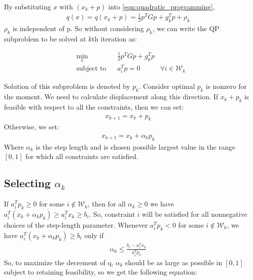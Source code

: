 By substituting $x$ with $(x_k+p)$ into \ref{eqn:quadratic_programming},
\begin{equation*}
	\begin{aligned}
		q(x) = q(x_k+p)= \frac{1}{2}p^TGp+g_k^Tp+\rho_k
	\end{aligned}
\end{equation*}
$\rho_k$ is independent of p. So without considering $\rho_k$, we can write the QP subproblem to be solved at $k$th iteration as:

\begin{equation}
	\begin{aligned}
		& \underset{x}{\text{min}} & & \frac{1}{2}p^{T}Gp+g_{k}^{T}p \\
& \text{subject to} & &  a_{i}^{T}p = 0 & \forall i\in \mathcal{W}_k
	\end{aligned}
	\label{eqn:Active_set_1}
\end{equation}

Solution of this subproblem is denoted by $p_k$. Consider optimal $p_k$ is nonzero for the moment. We need to calculate displacement along this direction. If $x_k+p_k$ is feasible with respect to all the constraints, then we can set:
\begin{equation*}
\begin{aligned}
	x_{k+1} = x_k + p_k
\end{aligned}
\end{equation*} 
Otherwise, we set:
\begin{equation}
	\begin{aligned}
		x_{k+1} = x_k + \alpha_{k}p_{k}
	\end{aligned}
	\label{eqn:Active_set_2}
\end{equation}
Where $\alpha_k$ is the step length and is chosen possible largest value in the range $[0,1]$ for which all constraints are satisfied.

\subsection*{Selecting $\alpha_k$}
If $a_{i}^{T}p_{k} \geqslant 0$ for some $i\notin \mathcal{W}_k$, then for all $\alpha_k \geqslant 0$ we have $a_{i}^T(x_k+\alpha_kp_k)\geqslant a_{i}^Tx_k \geqslant b_i$. So, constraint $i$ will be satisfied for all nonnegative choices of the step-length parameter. Whenever $a_i^Tp_k < 0$ for some $i\notin \mathcal{W}_k$, we have  $a_{i}^T(x_k+\alpha_kp_k) \geqslant b_i$ only if
\begin{equation*}
	\begin{aligned}
		\alpha_k \leqslant \frac{b_i-a_i^Tx_k}{a_i^Tp_k}
	\end{aligned}
\end{equation*}
So, to maximize the decrement of q, $\alpha_k$ should be as large as possible in $[0,1]$ subject to retaining feasibility, so we get the following equation:

